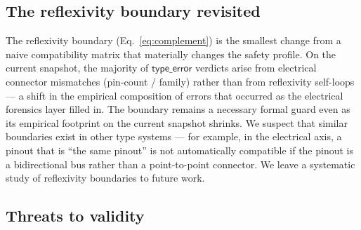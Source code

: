 \documentclass[11pt,twocolumn]{article}
\begin{document}
\subsection{The reflexivity boundary revisited}

The reflexivity boundary (Eq.~\eqref{eq:complement}) is the smallest
change from a naive compatibility matrix that materially changes the
safety profile. On the current snapshot, the majority of
$\mathsf{type\_error}$ verdicts arise from electrical connector
mismatches (pin-count / family) rather than from reflexivity
self-loops --- a shift in the empirical composition of errors that
occurred as the electrical forensics layer filled in. The boundary
remains a necessary formal guard even as its empirical footprint
on the current snapshot shrinks. We suspect that similar boundaries
exist in other type systems --- for example, in the electrical axis,
a pinout that is ``the same pinout'' is not automatically compatible
if the pinout is a bidirectional bus rather than a point-to-point
connector. We leave a systematic study of reflexivity boundaries
to future work.

\subsection{Threats to validity}\label{sec:threats}
\end{document}
